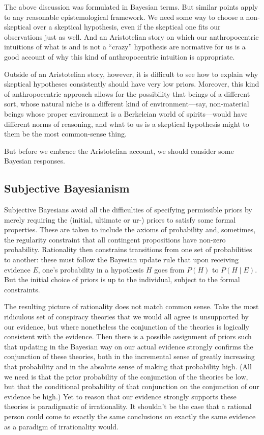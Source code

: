 The above discussion was formulated in Bayesian terms. But similar points apply to any reasonable epistemological framework.
We need some way to choose a non-skeptical over a skeptical hypothesis, even if the skeptical one fits our observations just 
as well. And an Aristotelian story on which our anthropocentric intuitions of what is and is not a ``crazy'' hypothesis 
are normative for us is a good account of why this kind of anthropocentric intuition is appropriate.

Outside of an Aristotelian story, however, it is difficult to see how to explain why
skeptical hypotheses consistently should have very low priors. Moreover, this kind of anthropocentric approach 
allows for the possibility that beings of a different sort, whose natural niche is a different kind of 
environment---say, non-material beings whose proper environment is a Berkeleian world of spirits---would have
different norms of reasoning, and what to us is a skeptical hypothesis might to them be the most common-sense thing.

But before we embrace the Aristotelian account, we should consider some Bayesian responses.

\subsection{Subjective Bayesianism}
Subjective Bayesians avoid all the difficulties of specifying permissible priors by merely
requiring the (initial, ultimate or ur-) priors to satisfy some formal properties. These are taken to include the
axioms of probability and, sometimes, the regularity constraint that all contingent 
propositions have non-zero probability. Rationality then constrains transitions from one
set of probabilities to another: these must follow the Bayesian update rule that upon
receiving evidence $E$, one's probability in a hypothesis $H$ goes from $P(H)$ to 
$P(H\mid E)$. But the initial choice of priors is up to the individual, subject to the
formal constraints.

The resulting picture of rationality does not match common sense. Take the most
ridiculous set of conspiracy theories that we would all agree is unsupported by our evidence, 
but where nonetheless the conjunction of the theories is logically consistent with the evidence.
Then there is a possible assignment of priors such that updating in the Bayesian way on our actual 
evidence strongly confirms the conjunction of these theories, both in the incremental sense of 
greatly increasing that probability and in the absolute sense of making that probability high. (All 
we need is that the prior probability of the conjunction of the theories be low, but that the conditional
probability of that conjunction on the conjunction of our evidence be high.) Yet to reason that
our evidence strongly supports these theories is paradigmatic of irrationality. It shouldn't be the
case that a rational person could come to exactly the same conclusions on exactly the same evidence
as a paradigm of irrationality would.

